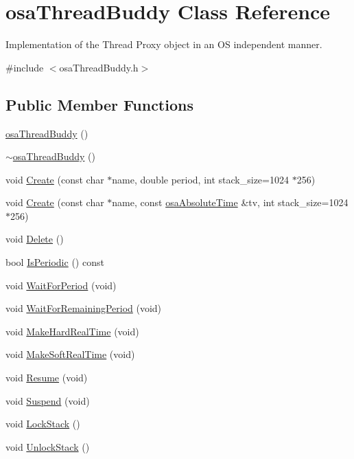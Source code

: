 \hypertarget{classosa_thread_buddy}{\section{osa\-Thread\-Buddy Class Reference}
\label{classosa_thread_buddy}
}


Implementation of the Thread Proxy object in an O\-S independent manner.  




{\ttfamily \#include $<$osa\-Thread\-Buddy.\-h$>$}

\subsection*{Public Member Functions}
\begin{DoxyCompactItemize}
\item 
\hyperlink{classosa_thread_buddy_a334d30a95ac595ef84fb35d69dc706a1}{osa\-Thread\-Buddy} ()
\item 
\hyperlink{classosa_thread_buddy_ace67a6e57c40840449f4c65931d947ee}{$\sim$osa\-Thread\-Buddy} ()
\item 
void \hyperlink{classosa_thread_buddy_a15cdc68a68ba0555bd970b9f787f3129}{Create} (const char $\ast$name, double period, int stack\-\_\-size=1024 $\ast$256)
\item 
void \hyperlink{classosa_thread_buddy_ab7801bfa4574a2420a990b409e2b3be0}{Create} (const char $\ast$name, const \hyperlink{structosa_absolute_time}{osa\-Absolute\-Time} \&tv, int stack\-\_\-size=1024 $\ast$256)
\item 
void \hyperlink{classosa_thread_buddy_af3d06bec58fa682a95e05cf6e632507e}{Delete} ()
\item 
bool \hyperlink{classosa_thread_buddy_a7ebd43f0391370586abeb598e69e80f6}{Is\-Periodic} () const 
\item 
void \hyperlink{classosa_thread_buddy_ab6f53e0d21b9dd672f4d6bde5d608b1e}{Wait\-For\-Period} (void)
\item 
void \hyperlink{classosa_thread_buddy_aba8ca36b6029b10a13a8fe436c832658}{Wait\-For\-Remaining\-Period} (void)
\item 
void \hyperlink{classosa_thread_buddy_aea7ffe95f0837d4beedaa2037a4ff153}{Make\-Hard\-Real\-Time} (void)
\item 
void \hyperlink{classosa_thread_buddy_aedee30367d430fb9e6333c2373ab00f3}{Make\-Soft\-Real\-Time} (void)
\item 
void \hyperlink{classosa_thread_buddy_a9706080a6c83380927b36a31a70f2cc5}{Resume} (void)
\item 
void \hyperlink{classosa_thread_buddy_a01c2a24bcf816db413af39f980c44efc}{Suspend} (void)
\item 
void \hyperlink{classosa_thread_buddy_a31d77d59d74b0f1cfe5a060435c8e469}{Lock\-Stack} ()
\item 
void \hyperlink{classosa_thread_buddy_af0a5bed1d246b660b80af3fd3b90ad1b}{Unlock\-Stack} ()
\end{DoxyCompactItemize}


